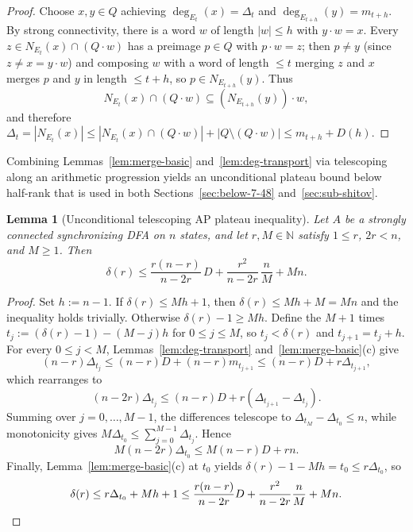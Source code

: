 \documentclass[11pt]{article}
\newtheorem{lemma}[theorem]{Lemma}
\theoremstyle{definition}
\theoremstyle{remark}
\newcommand{\N}{\mathbb{N}}
\begin{document}
\begin{proof}
Choose $x, y \in Q$ achieving $\deg_{E_t}(x) = \Delta_t$ and $\deg_{E_{t+h}}(y) = m_{t+h}$. By strong connectivity, there is a word $w$ of length $|w| \le h$ with $y \cdot w = x$. Every $z \in N_{E_t}(x) \cap (Q \cdot w)$ has a preimage $p \in Q$ with $p \cdot w = z$; then $p \ne y$ (since $z \ne x = y \cdot w$) and composing $w$ with a word of length $\le t$ merging $z$ and $x$ merges $p$ and $y$ in length $\le t + h$, so $p \in N_{E_{t+h}}(y)$. Thus
\[
  N_{E_t}(x) \cap (Q \cdot w) \subseteq (N_{E_{t+h}}(y)) \cdot w,
\]
and therefore $\Delta_t = |N_{E_t}(x)| \le |N_{E_t}(x) \cap (Q \cdot w)| + |Q \setminus (Q \cdot w)| \le m_{t+h} + D(h)$.
\end{proof}

Combining Lemmas~\ref{lem:merge-basic} and~\ref{lem:deg-transport} via telescoping along an arithmetic progression yields an unconditional plateau bound below half-rank that is used in both Sections~\ref{sec:below-7-48} and~\ref{sec:sub-shitov}.

\begin{lemma}[Unconditional telescoping AP plateau inequality]\label{lem:ap-plateau}
Let $A$ be a strongly connected synchronizing DFA on $n$ states, and let $r, M \in \N$ satisfy $1 \le r$, $2r < n$, and $M \ge 1$. Then
\[
  \delta(r) \le \frac{r(n - r)}{n - 2r}\, D + \frac{r^2}{n - 2r}\, \frac{n}{M} + M n.
\]
\end{lemma}

\begin{proof}
Set $h := n - 1$. If $\delta(r) \le M h + 1$, then $\delta(r) \le M h + M = M n$ and the inequality holds trivially. Otherwise $\delta(r) - 1 \ge M h$. Define the $M + 1$ times $t_j := (\delta(r) - 1) - (M - j) h$ for $0 \le j \le M$, so $t_j < \delta(r)$ and $t_{j+1} = t_j + h$. For every $0 \le j < M$, Lemmas~\ref{lem:deg-transport} and~\ref{lem:merge-basic}(c) give
\[
  (n - r) \Delta_{t_j} \le (n - r) D + (n - r) m_{t_{j+1}} \le (n - r) D + r \Delta_{t_{j+1}},
\]
which rearranges to
\[
  (n - 2r) \Delta_{t_j} \le (n - r) D + r (\Delta_{t_{j+1}} - \Delta_{t_j}).
\]
Summing over $j = 0, \dots, M - 1$, the differences telescope to $\Delta_{t_M} - \Delta_{t_0} \le n$, while monotonicity gives $M \Delta_{t_0} \le \sum_{j=0}^{M-1} \Delta_{t_j}$. Hence
\[
  M (n - 2r) \Delta_{t_0} \le M (n - r) D + r n.
\]
Finally, Lemma~\ref{lem:merge-basic}(c) at $t_0$ yields $\delta(r) - 1 - M h = t_0 \le r \Delta_{t_0}$, so
\[
  \delta(r) \le r \Delta_{t_0} + M h + 1 \le \frac{r(n - r)}{n - 2r} D + \frac{r^2}{n - 2r} \frac{n}{M} + M n. \qedhere
\]
\end{proof}
\end{document}
